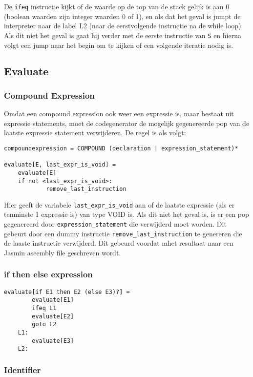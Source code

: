 \documentclass[]{article}
\begin{document}
De \texttt{ifeq} instructie kijkt of de waarde op de top van de stack gelijk is aan 0 (boolean waarden zijn integer waarden 0 of 1), en als dat het geval is jumpt de interpreter naar de label L2 (naar de eerstvolgende instructie na de while loop). Als dit niet het geval is gaat hij verder met de eerste instructie van \texttt{S} en hierna volgt een jump naar het begin om te kijken of een volgende iteratie nodig is.

\subsection{Evaluate}
\subsubsection{Compound Expression}
Omdat een compound expression ook weer een expressie is, maar bestaat uit expressie statements, moet de codegenerator de mogelijk gegenereerde pop van de laatste expressie statement verwijderen. De regel is als volgt:

\begin{verbatim}
compoundexpression = COMPOUND (declaration | expression_statement)*

evaluate[E, last_expr_is_void] =
    evaluate[E]
    if not <last_expr_is_void>:
    	    remove_last_instruction
\end{verbatim}

Hier geeft de variabele \texttt{last\_expr\_is\_void} aan of de laatste expressie (als er tenminste 1 expressie is) van type VOID is. Als dit niet het geval is, is er een pop gegenereerd door \texttt{expression\_statement} die verwijderd moet worden. Dit gebeurt door een dummy instructie \texttt{remove\_last\_instruction} te genereren die de laaste instructie verwijderd. Dit gebeurd voordat mhet resultaat naar een Jasmin aseembly file geschreven wordt.

\subsubsection{if then else expression}

\begin{verbatim}
evaluate[if E1 then E2 (else E3)?] =
        evaluate[E1]
        ifeq L1
        evaluate[E2]
        goto L2
    L1:
        evaluate[E3]
    L2:
\end{verbatim}

\subsubsection{Identifier}
\label{Identifier}
\end{document}
